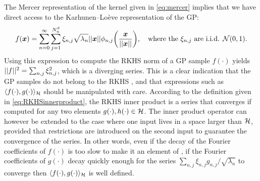 The Mercer representation of the kernel given in \cref{eq:mercer} implies that we have direct access to the Karhunen–Lo\`eve representation of the GP:
\begin{equation}
\label{eq:karhunen-loeve}
    f(\vx) =  \sum_{n=0}^\infty \sum_{j=1}^{\dnumharmonicsforlevel}  \xi_{n,j} \sqrt{\lambda_n} \norm{\vx} \sh_{n, j}\left(\frac{\vx}{\norm{\vx}}\right), \text{\quad where the } \xi_{n,j} \text{ are i.i.d. } \mathcal{N}(0, 1).
\end{equation}
Using this expression to compute the RKHS norm of a GP sample $f(\cdot)$ yields $\lvert\lvert f\rvert\rvert^2 = \sum_{n, j} \xi_{n,j}^2$, which is a diverging series. This is a clear indication that the GP samples do not belong to the RKHS \citep{kanagawa2018gaussian}, and that expressions such as $\langle f(\cdot), g(\cdot) \rangle_{{\mathcal{H}}}$ should be manipulated with care. According to the definition given in \cref{eq:RKHSinnerproduct}, the RKHS inner product is a series that converges if computed for any two elements  $g(\cdot), h(\cdot) \in {\mathcal{H}}$. The inner product operator can however be extended to the case where one input lives in a space larger than ${\mathcal{H}}$, provided that restrictions are introduced on the second input to guarantee the convergence of the series. In other words, even if the decay of the Fourier coefficients of $f(\cdot)$ is too slow to make it an element of \rkhs, if the Fourier coefficients of $g(\cdot)$ decay quickly enough for the series $\sum_{n,j} \xi_{n,j} g_{n,j}/ \sqrt{\lambda_n}$ to converge then $\langle f(\cdot), g(\cdot) \rangle_{{\mathcal{H}}}$ is well defined.

